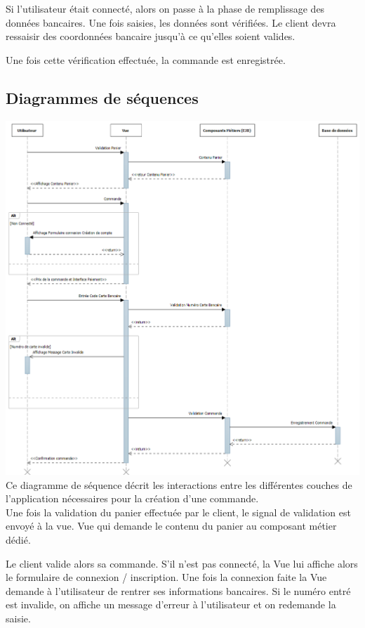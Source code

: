 	Si l'utilisateur était connecté, alors on passe à la phase de remplissage des données bancaires. Une fois saisies, les données sont vérifiées. Le client devra ressaisir des coordonnées bancaire jusqu’à ce qu'elles soient valides.

	Une fois cette vérification effectuée, la commande est enregistrée.

	\clearpage
	\subsection{Diagrammes de séquences}
	\includegraphics[scale=0.39]{Res/sequenceDiagramOrder.png}
	Ce diagramme de séquence décrit les interactions entre les différentes couches de l’application nécessaires pour la création d'une commande. \\

	Une fois la validation du panier effectuée par le client, le signal de validation est envoyé à la vue. Vue qui demande le contenu du panier au composant métier dédié.

	Le client valide alors sa commande. S'il n'est pas connecté, la Vue lui affiche alors le formulaire de connexion / inscription. Une fois la connexion faite la Vue demande à l'utilisateur de rentrer ses informations bancaires. Si le numéro entré est invalide, on affiche un message d'erreur  à l'utilisateur et on redemande la saisie.


